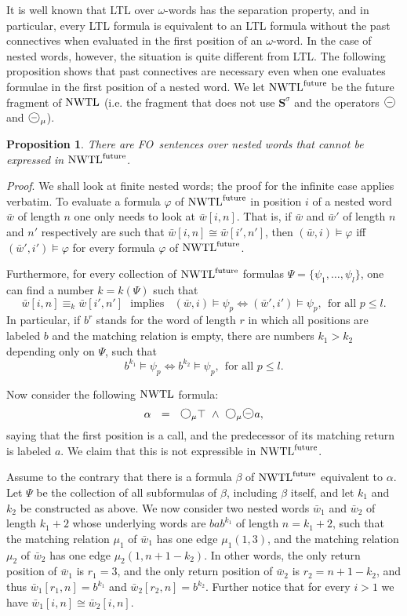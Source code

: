 \documentclass{LMCS}
\newcommand{\M}{{\mu}}
\newcommand{\w}{{\bar{w}}}
\newcommand{\dm}{\Diamond}
\newcommand{\U}{{\mathbf U}}
\renewcommand{\S}{{\mathbf S}}
\newcommand{\next}{\text{\raisebox{1pt}{$\bigcirc$}}}
\newcommand{\FO}{{\rm FO}}
\renewcommand{\phi}{\varphi}
\theoremstyle{plain}
\newtheorem{proposition}[theorem]{Proposition}
\theoremstyle{definition}
\newcommand{\ppath}{\sigma} \newcommand{\Ul}{\U}
\newcommand{\Sp}{\S^\ppath}
\newcommand{\prev}{{\text{\Large $\mathbf{\circleddash}$}}}
\newcommand{\nwtlf}{\nwtl^{\text{\rm future}}}
\newcommand{\dmm}{\dm_{\M}}
\newcommand{\dmminus}{\dm^-}
\newcommand{\dmmminus}{\dm_{\M}^-}
\renewcommand{\dm}{\next}
\renewcommand{\dmminus}{\prev}
\renewcommand{\dmm}{\dm_\M}
\renewcommand{\dmmminus}{\dmminus_{\M}}
\newcommand{\efeq}{\equiv}
\begin{document}
It is well known that LTL over $\omega$-words has the separation
property, and in particular, every LTL formula is equivalent to an LTL
formula without the past connectives when evaluated in the first
position of an $\omega$-word. In the case of nested words, however,
the situation is quite different from LTL. The following proposition
shows that past connectives are necessary even when one evaluates
formulae in the first position of a nested word.  We let $\nwtlf$ be
the future fragment of $\text{\rm NWTL}$ (i.e. the fragment that does not use
$\Sp$ and the operators $\dmminus$ and $\dmmminus$).

\begin{proposition}
\label{nwtlf-prop}
There are \FO\ sentences over nested words that cannot be expressed in
$\nwtlf$.
\end{proposition}

{\em Proof}. 
We shall look at finite nested words; the proof for the infinite case
applies verbatim. To evaluate a formula $\phi$ of $\nwtlf$ in position
$i$ of a nested word $\w$ of length $n$ one only needs to look at
$\w[i,n]$. That is, if $\w$ and $\w'$ of length $n$ and $n'$
respectively are such that $\w[i,n]\cong\w[i',n']$, then
$(\w,i)\models\phi$ iff $(\w',i')\models\phi$ for every formula $\phi$
of $\nwtlf$. 

Furthermore, for every collection of $\nwtlf$ formulas
$\Psi=\{\psi_1,\ldots,\psi_l\}$, one can find a number $k=k(\Psi)$
such that $$\w[i,n] \efeq_k \w[i',n'] \ \ \ \text{implies}\ \ \ \
(\w,i)\models\psi_p \Leftrightarrow (\w',i')\models\psi_p, \ \
\text{for all }p\leq l.$$ In particular, if $b^r$ stands for the word
of length $r$ in which all positions are labeled $b$ and the matching
relation is empty, there are numbers $k_1 >k_2$
depending only on $\Psi$, such that 
\[b^{k_1} \models \psi_p 
\Leftrightarrow b^{k_2}\models\psi_p, \ \ \text{for all }p\leq l.\]

Now consider the following $\text{\rm NWTL}$ formula: $$\alpha \ \ = \ \
\dmm\top \ \wedge\ \dmm\dmminus a,$$ saying that the first position is
a call, and the predecessor of its matching return is labeled $a$.  We
claim that this is not expressible in $\nwtlf$.

Assume to the contrary that there is a formula $\beta$ of $\nwtlf$
equivalent to $\alpha$. Let $\Psi$ be the collection of all
subformulas of $\beta$, including $\beta$ itself, and let $k_1$ and
$k_2$ be constructed as above. We now consider two nested words $\w_1$
and $\w_2$ of length $k_1+2$ whose
underlying words are $bab^{k_1}$ of length $n=k_1+2$, such that the matching relation
$\M_1$ of $\w_1$ has one edge $\mu_1(1,3)$, and the matching relation
$\M_2$ of $\w_2$ has one edge $\mu_2(1,n+1-k_2)$. In other words, the only
return position of $\w_1$ is $r_1=3$, and  the only
return position of $\w_2$ is $r_2=n+1-k_2$, and thus
$\w_1[r_1,n]=b^{k_1}$ and $\w_2[r_2,n]=b^{k_2}$. 
Further notice that for every $i > 1$ we have $\w_1[i,n]\cong
\w_2[i,n]$. 
\end{document}
